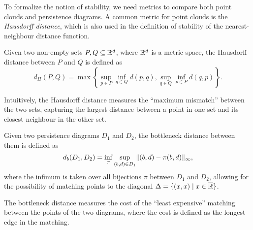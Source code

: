 To formalize the notion of stability, we need metrics to compare both point
clouds and persistence diagrams. A common metric for point clouds is the
\emph{Hausdorff distance}, which is also used in the definition of stability of
the nearest-neighbour distance function.
\begin{definition}
    Given two non-empty sets $P, Q \subseteq \mathbb{R}^d$, where $\mathbb{R}^d$ is a metric
    space, the Hausdorff distance between $P$ and $Q$ is defined as
    \begin{equation}
        d_H(P, Q) = \max\left\{ \sup_{p \in P} \inf_{q \in Q} d(p, q), \sup_{q \in Q} \inf_{p \in P} d(q, p) \right\}.
    \end{equation}
\end{definition}
Intuitively, the Hausdorff distance measures the ``maximum mismatch'' between the two
sets, capturing the largest distance between a point in one set and its closest
neighbour in the other set.

\begin{definition}
    Given two persistence diagrams $D_1$ and $D_2$, the bottleneck distance
    between them is defined as
    \begin{equation}
        d_b(D_1, D_2) = \inf_\pi \sup_{(b, d) \in D_1} \lVert(b, d) - \pi(b, d)\rVert_\infty,
    \end{equation}
    where the infimum is taken over all bijections $\pi$ between $D_1$ and
    $D_2$, allowing for the possibility of matching points to the diagonal $\Delta = \{(x, x) \mid x \in \overline{\mathbb{R}}\}$.
\end{definition}
The bottleneck distance measures the cost of the ``least expensive'' matching
between the points of the two diagrams, where the cost is defined as the longest
edge in the matching.


